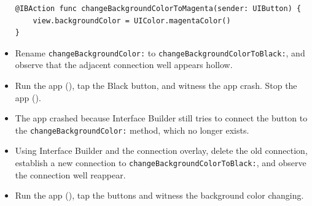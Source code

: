 \documentclass[a4paper,11pt]{scrartcl}
\begin{document}
\begin{itemize}
\begin{lstlisting}
@IBAction func changeBackgroundColorToMagenta(sender: UIButton) {
	view.backgroundColor = UIColor.magentaColor()
}
\end{lstlisting}
\item Rename \texttt{changeBackgroundColor:} to \texttt{changeBackgroundColorToBlack:}, and observe that the adjacent connection well appears hollow.
\item Run the app (), tap the Black button, and witness the app crash. Stop the app ().
\item The app crashed because Interface Builder still tries to connect the button to the \texttt{changeBackgroundColor:} method, which no longer exists.
\item Using Interface Builder and the connection overlay, delete the old connection, establish a new connection to \texttt{changeBackgroundColorToBlack:}, and observe the connection well reappear.
\item Run the app (), tap the buttons and witness the background color changing.
\end{itemize}
\end{document}
